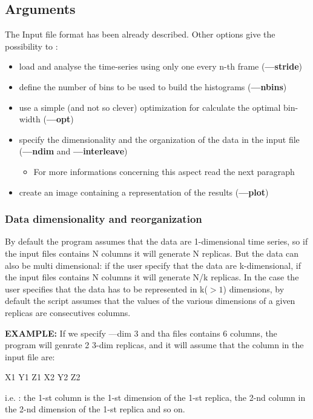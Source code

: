 \documentclass{report}
\begin{document}
\subsection{Arguments}

The Input file format has been already described. Other options give the
possibility to :

\begin{itemize}
\item
  load and analyse the time-series using only one every n-th frame
  (\textbf{---stride})
\item
  define the number of bins to be used to build the histograms
  (\textbf{---nbins})
\item
  use a simple (and not so clever) optimization for calculate the
  optimal bin-width (\textbf{---opt})
\item
  specify the dimensionality and the organization of the data in the
  input file (\textbf{---ndim} and \textbf{---interleave})
  \begin{itemize}
  \item
    For more informations concerning this aspect read the next paragraph
  \end{itemize}
\item
  create an image containing a representation of the results
  (\textbf{---plot})
\end{itemize}

\subsubsection{Data dimensionality and reorganization}

By default the program assumes that the data are 1-dimensional time
series, so if the input files contains N columns it will generate N
replicas. But the data can also be multi dimensional: if the user
specify that the data are k-dimensional, if the input files contains N
columns it will generate N/k replicas. In the case the user specifies
that the data has to be represented in k($>1$) dimensions, by default
the script assumes that the values of the various dimensions of a given
replicas are consecutives columns.

\textbf{EXAMPLE:} If we specify ---dim 3 and tha files contains 6
columns, the program will genrate 2 3-dim replicas, and it will assume
that the column in the input file are:

X1 Y1 Z1 X2 Y2 Z2

i.e. : the 1-st column is the 1-st dimension of the 1-st replica, the
2-nd column in the 2-nd dimension of the 1-st replica and so on.
\end{document}
